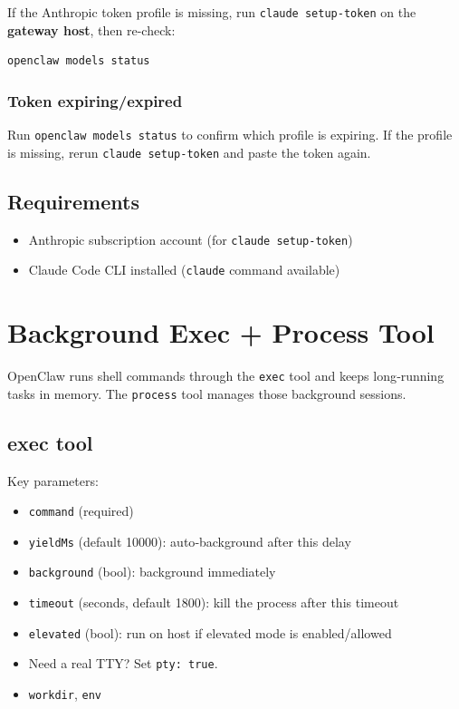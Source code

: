 If the Anthropic token profile is missing, run \texttt{claude setup-token} on the
\textbf{gateway host}, then re-check:

\begin{lstlisting}[language=bash]
openclaw models status
\end{lstlisting}


\subsubsection{Token expiring/expired}


Run \texttt{openclaw models status} to confirm which profile is expiring. If the profile
is missing, rerun \texttt{claude setup-token} and paste the token again.

\subsection{Requirements}


\begin{itemize}
  \item Anthropic subscription account (for \texttt{claude setup-token})
  \item Claude Code CLI installed (\texttt{claude} command available)
\end{itemize}



\clearpage

\section{Background Exec + Process Tool}


OpenClaw runs shell commands through the \texttt{exec} tool and keeps long‑running tasks in memory. The \texttt{process} tool manages those background sessions.

\subsection{exec tool}


Key parameters:

\begin{itemize}
  \item \texttt{command} (required)
  \item \texttt{yieldMs} (default 10000): auto‑background after this delay
  \item \texttt{background} (bool): background immediately
  \item \texttt{timeout} (seconds, default 1800): kill the process after this timeout
  \item \texttt{elevated} (bool): run on host if elevated mode is enabled/allowed
  \item Need a real TTY? Set \texttt{pty: true}.
  \item \texttt{workdir}, \texttt{env}
\end{itemize}



